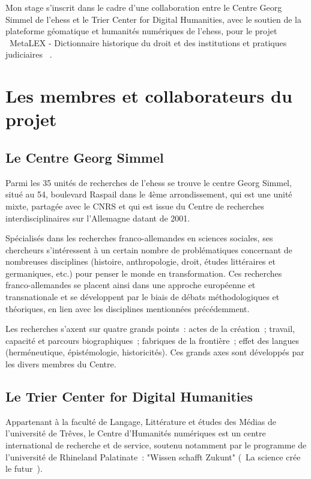 
Mon stage s'inscrit dans le cadre d'une collaboration entre le Centre Georg Simmel de l'\acrshort{ehess} et le Trier Center for Digital Humanities, avec le soutien de la plateforme géomatique et humanités numériques de l'\acrshort{ehess}, pour le projet \og~MetaLEX - Dictionnaire historique du droit et des institutions et pratiques judiciaires~\fg{} .

\section{Les membres et collaborateurs du projet}
\subsection{Le Centre Georg Simmel}
Parmi les 35 unités de recherches de l'\acrshort{ehess} se trouve le centre Georg Simmel, situé au 54, boulevard Raspail dans le 4ème arrondissement, qui est une unité mixte, partagée avec le CNRS et qui est issue du Centre de recherches interdisciplinaires sur l'Allemagne datant de 2001.

Spécialisés dans les recherches franco-allemandes en sciences sociales, ses chercheurs s'intéressent à un certain nombre de problématiques concernant de nombreuses disciplines (histoire, anthropologie, droit, études littéraires et germaniques, etc.) pour penser le monde en transformation. Ces recherches franco-allemandes se placent ainsi dans une approche européenne et transnationale et se développent par le biais de débats méthodologiques et théoriques, en lien avec les disciplines mentionnées précédemment.

Les recherches s'axent sur quatre grands points~: actes de la création~; travail, capacité et parcours biographiques~; fabriques de la frontière~; effet des langues (herméneutique, épistémologie, historicités). Ces grands axes sont développés par les divers membres du Centre.

\subsection{Le Trier Center for Digital Humanities}
Appartenant à la faculté de Langage, Littérature et études des Médias de l'université de Trêves, le Centre d'Humanités numériques est un centre international de recherche et de service, soutenu notamment par le programme de l'université de Rhineland Palatinate~: "Wissen schafft Zukunt" (\og~La science crée le futur~\fg{}).

